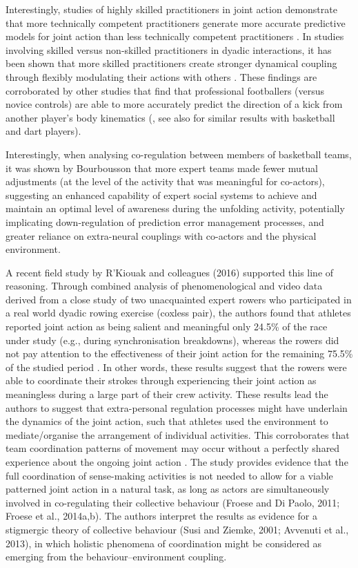 \begin{CJK}{UTF8}{gbsn}
Interestingly, studies of highly skilled practitioners in joint action demonstrate that more technically competent practitioners generate more accurate predictive models for joint action than less technically competent practitioners \citep{Tomeo2012,Aglioti2008,Mulligan2016}.   In studies involving skilled versus non-skilled practitioners in dyadic interactions, it has been shown that more skilled practitioners create stronger dynamical coupling through flexibly modulating their actions with others \citep{Schmidt2011, Caron2017}. These findings are corroborated by other studies that find that professional footballers (versus novice controls) are able to more accurately predict the direction of a kick from another player's body kinematics (\cite{Tomeo2012}, see also \cite{Aglioti2008,Mulligan2016} for similar results with basketball and dart players).

Interestingly, when analysing co-regulation between members of basketball teams, it was shown by Bourbousson \textcite{Bourbousson2015} that more expert teams made fewer mutual adjustments (at the level of the activity that was meaningful for co-actors), suggesting an enhanced capability of expert social systems to achieve and maintain an optimal level of awareness during the unfolding activity, potentially implicating down-regulation of prediction error management processes, and greater reliance on extra-neural couplings with co-actors and the physical environment.

A recent field study by R'Kiouak and colleagues (2016) supported this line of reasoning.  Through combined analysis of phenomenological and video data derived from a close study of two unacquainted expert rowers who participated in a real world dyadic rowing exercise (coxless pair), the authors found that athletes reported joint action as being salient and meaningful only 24.5\% of the race under study (e.g., during synchronisation breakdowns), whereas the rowers did not pay attention to the effectiveness of their joint action for the remaining 75.5\% of the studied period \citep{RKiouak2016}.  In other words, these results suggest that the rowers were able to coordinate their strokes through experiencing their joint action as meaningless during a large part of their crew activity.  These results lead the authors to suggest that extra-personal regulation processes might have underlain the dynamics of the joint action, such that athletes used the environment to mediate/organise the arrangement of individual activities. This corroborates that team coordination patterns of movement may occur without a perfectly shared experience about the ongoing joint action \citep{Bourbousson2011,Bourbousson2012}. The study provides evidence that the full coordination of sense-making activities is not needed to allow for a viable patterned joint action in a natural task, as long as actors are simultaneously involved in co-regulating their collective behaviour (Froese and Di Paolo, 2011; Froese et al., 2014a,b).  The authors interpret the results as evidence for a stigmergic theory of collective behaviour (Susi and Ziemke, 2001; Avvenuti et al., 2013), in which holistic phenomena of coordination might be considered as emerging from the behaviour–environment coupling.


\end{CJK}
